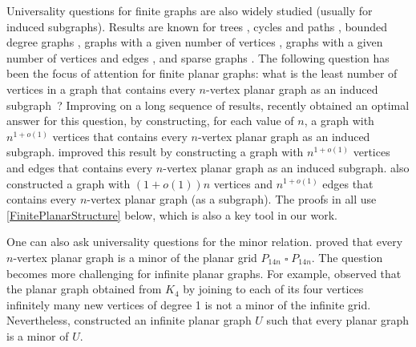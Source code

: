 \documentclass[a4paper,11pt]{article}
\theoremstyle{plain}
\theoremstyle{definition}
\newcommand{\CartProd}{\mathbin{\square}}
\begin{document}

Universality questions for finite graphs are also widely studied (usually for induced subgraphs). Results are known for trees \citep{ADK17,CGP78,CG78,GL68,Bodini02}, cycles and paths \citep{AAHKS20}, bounded degree graphs \citep{AC07,AA02,ELO08,AAHKBS17,AN19,Butler09}, graphs with a given number of vertices \citep{Moon65,AKTZ19,Alon17,BT81}, graphs with a given number of vertices and edges \citep{BDS19,CE83}, and sparse  graphs \citep{BCEGS82,BCLR89}. The following question has been the focus of attention for finite planar graphs: what is the least number of vertices in a graph that contains every $n$-vertex planar graph as an induced subgraph~\citep{BGP20,KNR92,GL07,DEJGMM,EJM}? Improving on a long sequence of results, \citet{DEJGMM} recently obtained an optimal answer for this question, by constructing, for each value of $n$, a graph with $n^{1+o(1)}$ vertices that contains every $n$-vertex  planar graph as an  induced subgraph. \citet{EJM} improved this result by constructing a graph with $n^{1+o(1)}$ vertices and edges that contains every $n$-vertex  planar graph as an induced subgraph. \citet{EJM} also constructed a graph with $(1+o(1))n$ vertices and $n^{1+o(1)}$ edges that contains every $n$-vertex planar graph (as a subgraph). The proofs in \cite{BGP20,DEJGMM,EJM} all use \cref{FinitePlanarStructure} below, which is also a key tool in our work. 


One can also ask universality questions for the minor relation.  \citet{RST-JCTB94} proved that every $n$-vertex planar graph is a minor of the planar grid $P_{14n} \CartProd P_{14n}$. The question becomes more challenging for infinite planar graphs. For example, \citet{DK99} observed that the planar graph obtained from $K_4$ by joining to each of its four vertices infinitely many new vertices of degree 1 is not a minor of the infinite grid. Nevertheless, \citet{DK99} constructed an infinite planar graph $U$ such that every planar graph is a minor of $U$. 
\end{document}
